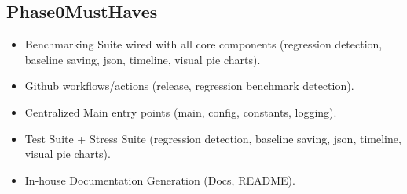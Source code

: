 \documentclass{article}
\begin{document}
\subsection{Phase0MustHaves}
\begin{itemize}[noitemsep]
\item Benchmarking Suite wired with all core components (regression detection, baseline saving, json, timeline, visual pie charts).
\item Github workflows/actions (release, regression benchmark detection).
\item Centralized Main entry points (main, config, constants, logging).
\item Test Suite + Stress Suite (regression detection, baseline saving, json, timeline, visual pie charts).
\item In-house Documentation Generation (Docs, README).
\end{itemize}
\end{document}
